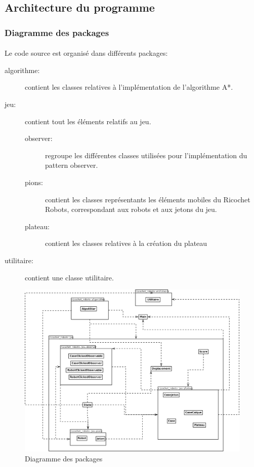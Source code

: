 \documentclass[a4paper, 12pt]{article}
\begin{document}
    \subsection{Architecture du programme}
    
        \subsubsection{Diagramme des packages}
            
            \paragraph{}
             Le code source est organisé dans différents packages:
             
            \begin{description}
            \item[algorithme:] contient les classes relatives à l'implémentation de l'algorithme A*.
                 \item[jeu:] contient tout les éléments relatifs au jeu.
                 \begin{description}
            	    \item[observer:] regroupe les différentes classes utilisées pour l'implémentation du pattern observer.
            	    \item[pions:] contient les classes représentants les éléments mobiles du Ricochet Robots, correspondant aux robots et aux jetons du jeu.  
            	    \item[plateau:] contient les classes relatives à la création du plateau
        	    \end{description}
                 \item[utilitaire:] contient une classe utilitaire.
             \end{description}
             
            \begin{figure}[H]
                \centering
                \includegraphics[scale=0.3]{images/diagrammePackage.png}
                 \caption{Diagramme des packages}
            \end{figure}
\end{document}
